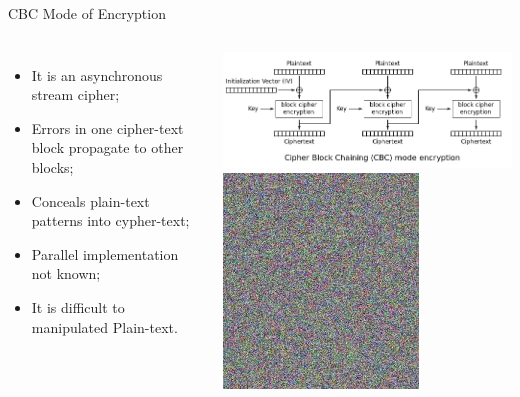 \documentclass[12pt,table,xcolor={dvipsnames}]{beamer}
\begin{document}
\begin{frame}{CBC Mode of Encryption}
\begin{columns}
\begin{itemize}
\item It is an asynchronous stream cipher;\pause
\item Errors in one cipher-text block propagate to other blocks;\pause
\item Conceals plain-text patterns into cypher-text;\pause
\item Parallel implementation not known;\pause
\item It is difficult to manipulated Plain-text.
\end{itemize}
\begin{center}
\includegraphics[scale=.25]{CBC_encryption.png}\pause\\
\includegraphics[scale=.35]{Tux_secure.jpg}
\end{center}
\end{columns}
\end{frame}
\end{document}
